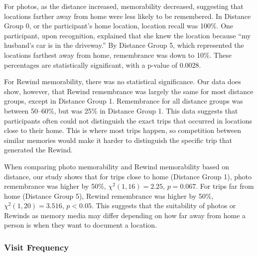 \documentclass{sigchi}
\begin{document}
For photos, as the distance increased, memorability decreased, suggesting that locations farther away from home were less likely to be remembered. In Distance Group 0, or the participant's home location, location recall was 100\%. One participant, upon recognition, explained that she knew the location because ``my husband's car is in the driveway.'' By Distance Group 5, which represented the locations farthest away from home, remembrance was down to 10\%. These percentages are statistically significant, with a p-value of 0.0028. 

For Rewind memorability, there was no statistical significance. Our data does show, however, that Rewind remembrance was largely the same for most distance groups, except in Distance Group 1. Remembrance for all distance groups was between 50--60\%, but was 25\% in Distance Group 1. This data suggests that participants often could not distinguish the exact trips that occurred in locations close to their home. This is where most trips happen, so competition between similar memories would make it harder to distinguish the specific trip that generated the Rewind.

When comparing photo memorability and Rewind memorability based on distance, our study shows that for trips close to home (Distance Group 1), photo remembrance was higher by 50\%, $\chi^2(1, 16) = 2.25$, $p = 0.067$. For trips far from home (Distance Group 5), Rewind remembrance was higher by 50\%, $\chi^2(1, 20) = 3.516$, $p < 0.05$. This suggests that the suitability of photos or Rewinds as memory media may differ depending on how far away from home a person is when they want to document a location. %

\subsubsection{Visit Frequency}
\end{document}
